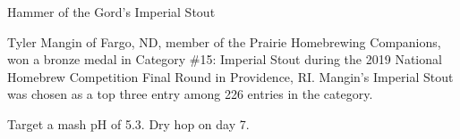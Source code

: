 \documentclass[fontsize=9pt,oneside]{scrbook}
\begin{document}
\mainmatter


\begin{recipe}{Hammer of the Gord's Imperial Stout}

\begin{aboutblock}
Tyler Mangin of Fargo, ND, member of the Prairie Homebrewing Companions, won a
bronze medal in Category \#15: Imperial Stout during the 2019 National Homebrew
Competition Final Round in Providence, RI. Mangin's Imperial Stout was chosen
as a top three entry among 226 entries in the category. \sourceaha
\end{aboutblock}


\begin{methodandtiming}
 
\begin{mashsteps}
\end{mashsteps}

\begin{fermentationsteps}
\end{fermentationsteps}

\begin{directions}
Target a mash pH of 5.3. Dry hop on day 7.
\end{directions}

\end{methodandtiming}

\recipebreak

\begin{ingredientsblock}

\begin{malts}
\end{malts}

\begin{hops}
\end{hops}


\end{ingredientsblock}

\end{recipe}

\backmatter


\end{document}
